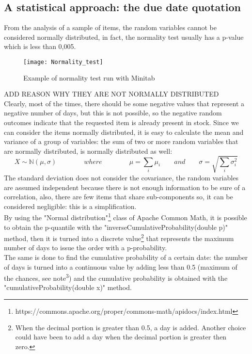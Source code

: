 \documentclass[a4paper,12pt]{article}
\begin{document}
\subsection{A statistical approach: the due date quotation}
From the analysis of a sample of items, the random variables cannot be considered normally distributed, in fact, the normality test usually has a p-value which is less than 0,005.\\
\begin{figure}[H]
	\begin{center}
		\texttt{[image: Normality\_test]}
		\caption{Example of normality test run with Minitab\textcopyright}
	\end{center}
\end{figure}
ADD REASON WHY THEY ARE NOT NORMALLY DISTRIBUTED\\
Clearly, most of the times, there should be some negative values that represent a negative number of days, but this is not possible, so the negative random outcomes indicate that the requested item is already present in stock. Since we can consider the items normally distributed, it is easy to calculate the mean and variance of a group of variables: the sum of two or more random variables that are normally distributed, is normally distributed as well:
\begin{equation*}
X \sim \mathbb{N}(\mu, \sigma)		\qquad \qquad where \qquad \qquad		\mu = \sum_{i} \mu_{i} 		 \qquad and\qquad			\sigma = \sqrt{\sum_{i} \sigma_{i}^{2}}
\end{equation*}
The standard deviation does not consider the covariance, the random variables are assumed independent because there is not enough information to be sure of a correlation, also, there are few items that share sub-components so, it can be considered negligible: this is a simplification. \\

By using the "Normal distribution"\footnote{https://commons.apache.org/proper/commons-math/apidocs/index.html} class of Apache Common Math, it is possible to obtain the p-quantile with the "inverseCumulativeProbability(double p)" method, then it is turned into a discrete value\footnote{When the decimal portion is greater than 0.5, a day is added. Another choice could have been to add a day when the decimal portion is greater then zero.} that represents the maximum number of days to issue the order with a p-probability. \\
The same is done to find the cumulative probability of a certain date: the number of days is turned into a continuous value by adding less than 0.5 (maximum of the chances, see note\textsuperscript{3}) and the cumulative probability is obtained with the "cumulativeProbability(double x)" method.
\end{document}
